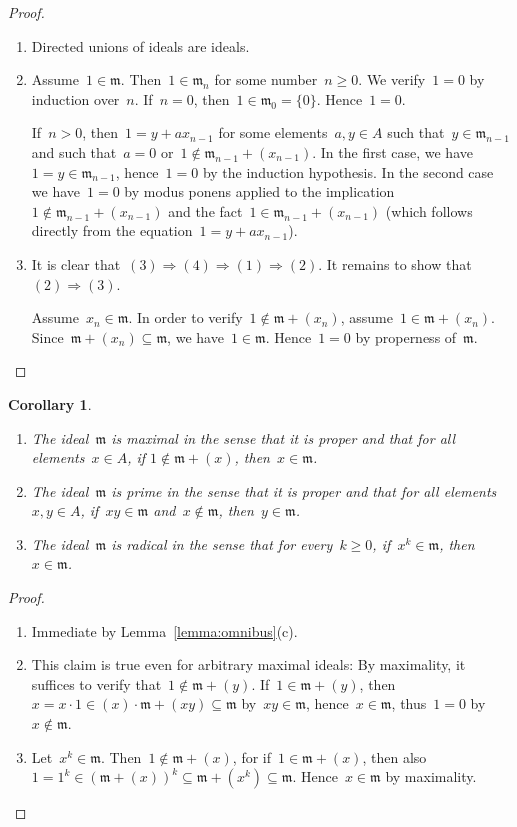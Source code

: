 \documentclass[com,11pt,crcready]{iosart2x}
\theoremstyle{definition}
\theoremstyle{plain}
\newtheorem{corollary}[definition]{Corollary}
\theoremstyle{remark}
\newcommand{\?}{\,{:}\,}
\newcommand{\mmm}{\mathfrak{m}}
\renewcommand{\_}{\mathpunct{.}\,}
\begin{document}
\begin{proof}\begin{enumerate}
\item[(a)] Directed unions of ideals are ideals.
\item[(b)] Assume~$1 \in \mmm$. Then~$1 \in \mmm_n$ for some number~$n \geq 0$. We
verify~$1 = 0$ by induction over~$n$.
If~$n = 0$, then~$1 \in \mmm_0 = \{0\}$. Hence~$1 = 0$.

If~$n > 0$, then~$1 = y + a x_{n-1}$ for some elements~$a,y \in A$ such that~$y
\in \mmm_{n-1}$ and such that~$a = 0$ or~$1 \not\in \mmm_{n-1} + (x_{n-1})$.
In the first case, we have~$1 = y \in \mmm_{n-1}$, hence~$1 = 0$ by the induction
hypothesis. In the second case we have~$1 = 0$ by modus ponens applied to the
implication~$1 \not\in \mmm_{n-1} + (x_{n-1})$ and the fact~$1 \in \mmm_{n-1} +
(x_{n-1})$ (which follows directly from the equation~$1 = y + a x_{n-1}$).
\item[(c)] It is clear that~$(3) \Rightarrow (4) \Rightarrow (1) \Rightarrow
(2)$. It remains to show that~$(2) \Rightarrow (3)$.

Assume~$x_n \in \mmm$. In order to verify~$1 \not\in \mmm + (x_n)$,
assume~$1 \in \mmm + (x_n)$. Since~$\mmm + (x_n) \subseteq \mmm$,
we have~$1 \in \mmm$. Hence~$1 = 0$ by properness of~$\mmm$.\qedhere
\end{enumerate}\end{proof}

\begin{corollary}\label{cor:is-prime-max}
\begin{enumerate}
\item[\textnormal{(a)}] The ideal~$\mmm$ is \emph{maximal} in the sense that it is proper and that for
all elements~$x \in A$, if $1 \not\in \mmm + (x)$, then~$x \in \mmm$.
\item[\textnormal{(b)}] The ideal~$\mmm$ is \emph{prime} in the
sense that it is proper and that for
all elements~$x,y \in A$, if~$xy \in \mmm$ and~$x \not\in \mmm$, then~$y \in
\mmm$.
\item[\textnormal{(c)}] The ideal~$\mmm$ is \emph{radical} in the sense that for every~$k \geq 0$, if~$x^k \in
\mmm$, then~$x \in \mmm$.
\end{enumerate}
\end{corollary}

\begin{proof}\begin{enumerate}
\item[(a)] Immediate by Lemma~\ref{lemma:omnibus}(c).
\item[(b)] This claim is true even for arbitrary maximal ideals: By maximality, it suffices to verify that~$1 \not\in
\mmm + (y)$. If~$1 \in \mmm + (y)$, then~$x = x\cdot1 \in (x) \cdot \mmm + (xy)
\subseteq \mmm$ by~$xy \in \mmm$, hence~$x \in \mmm$, thus~$1 = 0$ by~$x \not\in
\mmm$.
\item[(c)] Let~$x^k \in \mmm$. Then~$1 \not\in \mmm + (x)$, for if~$1 \in
\mmm + (x)$, then also~$1 = 1^k \in (\mmm + (x))^k \subseteq \mmm + (x^k)
\subseteq \mmm$. Hence~$x \in \mmm$ by maximality.\qedhere
\end{enumerate}
\end{proof}
\end{document}
